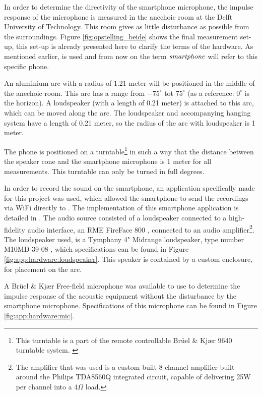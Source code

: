 In order to determine the directivity of the smartphone microphone, the impulse response of the microphone is measured in the anechoic room at the Delft University of Technology.
This room gives as little disturbance as possible from the surroundings.
Figure \ref{fig:opstelling_beide} shows the final measurement set-up, this set-up is already presented here to clarify the terms of the hardware.
As mentioned earlier, \nexus \cite{nexus5} is used and from now on the term $\it{smartphone}$ will refer to this specific phone. 

An aluminium arc with a radius of 1.21 meter will be positioned in the middle of the anechoic room.
This arc has a range from $-75^\circ$ tot $75^\circ$ (as a reference: $0^\circ$ is the horizon). A loudspeaker (with a length of 0.21 meter) is attached to this arc, which can be moved along the arc.
The loudspeaker and accompanying hanging system have a length of 0.21 meter, so the radius of the arc with loudspeaker is 1 meter. 

The phone is positioned on a turntable\footnote{This turntable is a part of the remote controllable Br\"uel \& Kj\ae r 9640 turntable system. \cite{manual:turntable}} in such a way that the distance between the speaker cone and the smartphone microphone is 1 meter for all measurements.
This turntable can only be turned in full degrees.

In order to record the sound on the smartphone, an application specifically made for this project was used, which allowed the smartphone to send the recordings via WiFi directly to \matlab.
The implementation of this smartphone application is detailed in \cite{BAP:RoySjoerd}.
The audio source consisted of a loudspeaker connected to a high-fidelity audio interface, an RME FireFace 800 \cite{manual:fireface}, connected to an audio amplifier\footnote{The amplifier that was used is a custom-built 8-channel amplifier built around the Philips TDA8560Q integrated circuit, capable of delivering 25W per channel into a 4$\Omega$ load.}.
The loudspeaker used, is a Tymphany 4" Midrange loudspeaker, type number M10MD-39-08 \cite{manual:loudspeaker}, which specifications can be found in Figure \ref{fig:app:hardware:loudspeaker}. 
This speaker is contained by a custom enclosure, for placement on the arc.

A Br\"uel \& Kj\ae r Free-field microphone \cite{manual:microphone} was available to use to determine the impulse response of the acoustic equipment without the disturbance by the smartphone microphone.
Specifications of this microphone can be found in Figure \ref{fig:app:hardware:mic}.

